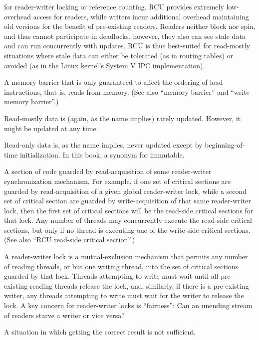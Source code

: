 \begin{description}
	for reader-writer locking or reference counting.
	RCU provides extremely low-overhead access for readers, while
	writers incur additional overhead maintaining old versions
	for the benefit of pre-existing readers.
	Readers neither block nor spin, and thus cannot participate in
	deadlocks, however, they also can see stale data and can
	run concurrently with updates.
	RCU is thus best-suited for read-mostly situations where
	stale data can either be tolerated (as in routing tables)
	or avoided (as in the Linux kernel's System V IPC implementation).
\item[\IXGh{Read}{Memory Barrier}:]
	A memory barrier that is only guaranteed to affect the ordering
	of load instructions, that is, reads from memory.
	(See also ``memory barrier'' and ``write memory barrier''.)
\item[\IXG{Read Mostly}:]
	Read-mostly data is (again, as the name implies) rarely updated.
	However, it might be updated at any time.
\item[\IXG{Read Only}:]
	Read-only data is, as the name implies, never updated except
	by beginning-of-time initialization.
	In this book, a synonym for immutable.
\item[\IXGh{Read-Side}{Critical Section}:]
	A section of code guarded by read-acquisition of
	some reader-writer synchronization mechanism.
	For example, if one set of critical sections are guarded by
	read-acquisition of
	a given global reader-writer lock, while a second set of critical
	section are guarded by write-acquisition of that same reader-writer
	lock, then the first set of critical sections will be the
	read-side critical sections for that lock.
	Any number of threads may concurrently execute the read-side
	critical sections, but only if no thread is executing one of
	the write-side critical sections.
	(See also ``RCU read-side critical section''.)
\item[\IXGh{Reader-Writer}{Lock}:]
	A reader-writer lock is a mutual-exclusion mechanism that
	permits any number of reading
	threads, or but one writing thread, into the set of critical
	sections guarded by that lock.
	Threads attempting to write must wait until all pre-existing
	reading threads release the lock, and, similarly, if there
	is a pre-existing writer, any threads attempting to write must
	wait for the writer to release the lock.
	A key concern for reader-writer locks is ``fairness'':
	Can an unending stream of readers starve a writer or vice versa?
\item[\IXG{Real Time}:]
	A situation in which getting the correct result is not sufficient,

\end{description}
